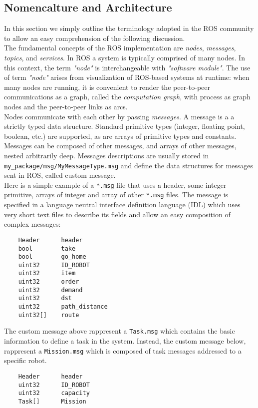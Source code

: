 \subsection{Nomencalture and Architecture}
In this section we simply outline the terminology adopted in the ROS
community to allow an easy comprehension of the following discussion.
\\
The fundamental concepts of the ROS implementation are \textit{nodes}, \textit{messages},
\textit{topics}, and \textit{services}.
In ROS a system is typically comprised of many nodes. In this context, the term
\textit{"node"} is interchangeable with \textit{"software module"}. The use of term 
\textit{"node"} arises from visualization of ROS-based systems at runtime:
when many nodes are running, it is convenient to render the peer-to-peer communications
as a graph, called the \textit{computation graph}, with process as graph nodes and 
the peer-to-peer links as arcs.
\\
Nodes communicate with each other by passing \textit{messages}. A message is a
a strictly typed data structure. Standard primitive types (integer, floating
point, boolean, etc.) are supported, as are arrays of primitive types and
constants. Messages can be composed of other messages, and arrays of other
messages, nested arbitrarily deep. Messages descriptions are usually stored
in \texttt{my\_package/msg/MyMessageType.msg} and define the data structures for
messages sent in ROS, called custom message.
\\ 
Here is a simple example of a \texttt{*.msg} file that uses a header, some integer primitive,
arrays of integer and array of other \texttt{*.msg} files. The message is specified 
in a language neutral interface definition language (IDL) which uses very short text 
files to describe its fields and allow an easy composition of complex messages:
\begin{multicols}{2}
\begin{lstlisting}
    Header      header
    bool        take
    bool        go_home
    uint32      ID_ROBOT
    uint32      item
    uint32      order
    uint32      demand
    uint32      dst
    uint32      path_distance
    uint32[]    route
\end{lstlisting}
The custom message above rappresent a \texttt{Task.msg} which contains the basic
information to define a task in the system. Instead, the custom message below, rappresent 
a \texttt{Mission.msg} which is composed of task messages addressed to a specific robot.  
\begin{lstlisting}
    Header      header
    uint32      ID_ROBOT
    uint32      capacity
    Task[]      Mission
\end{lstlisting}
\end{multicols}

